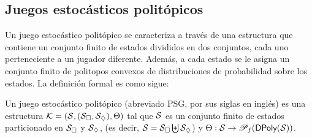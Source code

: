 

\subsection*{Juegos estocásticos politópicos}


Un juego estocástico politópico se caracteriza a través de una estructura que
contiene un conjunto finito de estados divididos en dos conjuntos, cada uno
perteneciente a un jugador diferente. Además, a cada estado se le asigna un
conjunto finito de politopos convexos de distribuciones de probabilidad sobre
los estados. La definición formal es como sigue:

\begin{definition}
	Un juego estocástico politópico (abreviado PSG, por sus siglas en inglés) es una estructura \( \mathcal{K} = (\mathcal{S}, (\mathcal{S}_\square, \mathcal{S}_\diamondsuit), \Theta) \) tal que \( \mathcal{S} \) es un conjunto finito de estados particionado en $\mathcal{S}_\square$ y $\mathcal{S}_\diamondsuit$, (es decir, \( \mathcal{S} = \mathcal{S}_\square \biguplus \mathcal{S}_\diamondsuit \)) y \( \Theta : \mathcal{S} \to \mathscr{P}_f(\textsf{DPoly}(\mathcal{S})) \).
\end{definition}


